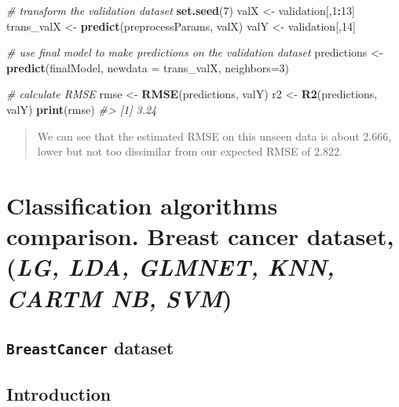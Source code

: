 \documentclass[]{book}
\newenvironment{Shaded}{\begin{snugshade}}{\end{snugshade}}
\newcommand{\CommentTok}[1]{\textcolor[rgb]{0.56,0.35,0.01}{\textit{#1}}}
\newcommand{\DataTypeTok}[1]{\textcolor[rgb]{0.13,0.29,0.53}{#1}}
\newcommand{\DecValTok}[1]{\textcolor[rgb]{0.00,0.00,0.81}{#1}}
\newcommand{\KeywordTok}[1]{\textcolor[rgb]{0.13,0.29,0.53}{\textbf{#1}}}
\newcommand{\NormalTok}[1]{#1}
\newcommand{\OperatorTok}[1]{\textcolor[rgb]{0.81,0.36,0.00}{\textbf{#1}}}
\newcommand{\StringTok}[1]{\textcolor[rgb]{0.31,0.60,0.02}{#1}}
\begin{document}
\begin{Shaded}
\begin{Highlighting}[]
\CommentTok{# transform the validation dataset}
\KeywordTok{set.seed}\NormalTok{(}\DecValTok{7}\NormalTok{)}
\NormalTok{valX <-}\StringTok{ }\NormalTok{validation[,}\DecValTok{1}\OperatorTok{:}\DecValTok{13}\NormalTok{]}
\NormalTok{trans_valX <-}\StringTok{ }\KeywordTok{predict}\NormalTok{(preprocessParams, valX)}
\NormalTok{valY <-}\StringTok{ }\NormalTok{validation[,}\DecValTok{14}\NormalTok{]}

\CommentTok{# use final model to make predictions on the validation dataset}
\NormalTok{predictions <-}\StringTok{ }\KeywordTok{predict}\NormalTok{(finalModel, }\DataTypeTok{newdata =}\NormalTok{ trans_valX, }\DataTypeTok{neighbors=}\DecValTok{3}\NormalTok{)}

\CommentTok{# calculate RMSE}
\NormalTok{rmse <-}\StringTok{ }\KeywordTok{RMSE}\NormalTok{(predictions, valY)}
\NormalTok{r2 <-}\StringTok{ }\KeywordTok{R2}\NormalTok{(predictions, valY)}
\KeywordTok{print}\NormalTok{(rmse)}
\CommentTok{#> [1] 3.24}
\end{Highlighting}
\end{Shaded}

\begin{quote}
We can see that the estimated RMSE on this unseen data is about 2.666, lower but not too dissimilar from our expected RMSE of 2.822.
\end{quote}

\hypertarget{classification-algorithms-comparison.-breast-cancer-dataset-lg-lda-glmnet-knn-cartm-nb-svm}{%
\chapter{\texorpdfstring{Classification algorithms comparison. Breast cancer dataset, (\emph{LG, LDA, GLMNET, KNN, CARTM NB, SVM})}{Classification algorithms comparison. Breast cancer dataset, (LG, LDA, GLMNET, KNN, CARTM NB, SVM)}}\label{classification-algorithms-comparison.-breast-cancer-dataset-lg-lda-glmnet-knn-cartm-nb-svm}}

\hypertarget{breastcancer-dataset}{%
\section{\texorpdfstring{\texttt{BreastCancer} dataset}{BreastCancer dataset}}\label{breastcancer-dataset}}

\hypertarget{introduction-4}{%
\section{Introduction}\label{introduction-4}}
\end{document}
